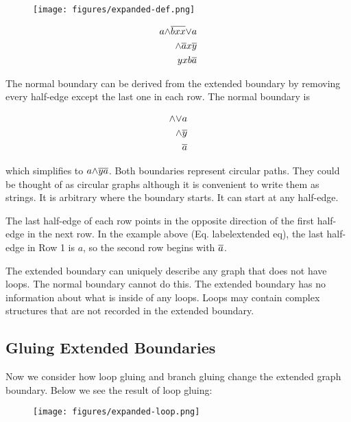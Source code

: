 \documentclass[acmtog]{acmart}
\begin{document}
\begin{figure}[H]
\centering
\texttt{[image: figures/expanded-def.png]}
\end{figure}

\begin{equation}
\label{extended eq}
\begin{split}
a {\wedge} \overline{bxx} {\vee} a \\
{\wedge} \overline{a} x \overline{y} \\ 
yxb \overline{a} \\
\end{split}
\end{equation}

The normal boundary can be derived from the extended boundary by removing every
half-edge except the last one in each row. The normal boundary is 

\begin{equation}
\begin{split}
{\wedge} {\vee} a \\
{\wedge} \overline{y} \\
\overline{a} \\
\end{split}
\end{equation}

\noindent which simplifies to $a {\wedge} \overline{ya}$. Both boundaries represent 
circular paths. They could be thought of as circular graphs although it is 
convenient to write them as strings. It is arbitrary where the boundary 
starts. It can start at any half-edge.

The last half-edge of each row points in the opposite direction of the first 
half-edge in the next row. In the example above (Eq. label{extended eq}), the
last half-edge in Row 1 is $a$, so the second row begins with $\overline{a}$.

The extended boundary can uniquely describe any graph that does not have 
loops. The normal boundary cannot do this. The extended boundary has no 
information about what is inside of any loops. Loops may contain complex 
structures that are not recorded in the extended boundary.

\subsection{Gluing Extended Boundaries}

Now we consider how loop gluing and branch gluing change the extended graph
boundary. Below we see the result of loop gluing:

\begin{figure}[H]
\centering
\texttt{[image: figures/expanded-loop.png]}
\end{figure}
\end{document}
